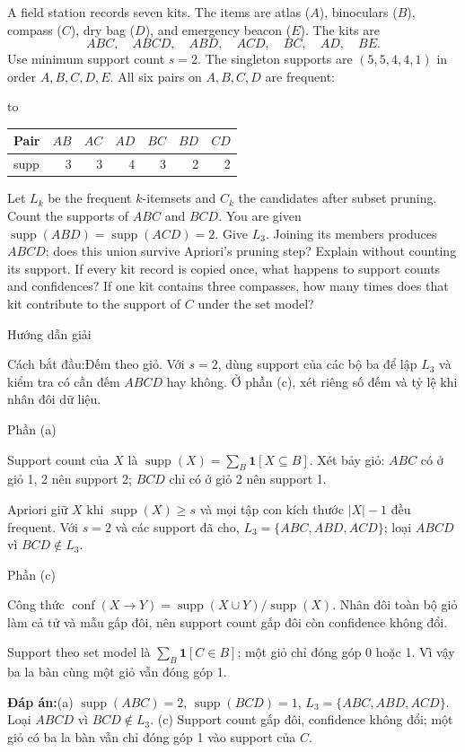 \documentclass[10pt,a4paper,twocolumn]{article}
\makeatletter
\newcommand{\maptag}[1]{\phantomsection\@bsphack\protected@write\@auxout{}{\string\newlabel{#1}{{}{\thepage}{}{\@currentHref}{}}}\@esphack}
\newcommand{\key}[1]{#1:\enspace}
\newcommand{\solutionprompt}[1]{\par\addvspace{1pt}\noindent\key{Cách bắt đầu}#1\par\addvspace{2pt}}
\newcommand{\blocklabel}[1]{\par\noindent#1\par\nobreak}
\newcommand{\answer}[1]{%
  \par\addvspace{3pt}%
  \blocklabel{#1Hướng dẫn giải}}
\newcommand{\finalanswer}[1]{%
  \par\addvspace{3pt}\noindent\textbf{Đáp án:}\nobreak\enspace#1\par}
\newcommand{\guidepart}[1]{%
  \par\addvspace{1.5pt}%
  \blocklabel{Phần #1}}
\newenvironment{examtable}[1]{%
  \par\addvspace{2pt}\noindent\hbox to \linewidth\bgroup\hfil
  \setlength{\tabcolsep}{4pt}%
  \renewcommand{\arraystretch}{1.12}\begin{tabular}{#1}%
}{\end{tabular}\hfil\egroup\par\addvspace{2pt}}
\makeatother
\begin{document}
A field station records seven kits. The items are atlas ($A$), binoculars ($B$), compass ($C$), dry bag ($D$), and emergency beacon ($E$). The kits are
\[
ABC,\quad ABCD,\quad ABD,\quad ACD,\quad BC,\quad AD,\quad BE.
\]
Use minimum support count $s=2$. The singleton supports are $(5,5,4,4,1)$ in order $A,B,C,D,E$. All six pairs on $A,B,C,D$ are frequent:
\begin{examtable}{@{}lrrrrrr@{}}
\toprule
Pair & $AB$ & $AC$ & $AD$ & $BC$ & $BD$ & $CD$\\
\midrule
supp & 3 & 3 & 4 & 3 & 2 & 2\\
\bottomrule
\end{examtable}
Let $L_k$ be the frequent $k$-itemsets and $C_k$ the candidates after subset pruning.
 Count the supports of $ABC$ and $BCD$. You are given $\operatorname{supp}(ABD)=\operatorname{supp}(ACD)=2$. Give $L_3$. Joining its members produces $ABCD$; does this union survive Apriori's pruning step? Explain without counting its support.
 If every kit record is copied once, what happens to support counts and confidences? If one kit contains three compasses, how many times does that kit contribute to the support of $C$ under the set model?

\answer{\maptag{answer:Pr1}}
\solutionprompt{Đếm theo giỏ. Với $s=2$, dùng support của các bộ ba để lập $L_3$ và kiểm tra có cần đếm $ABCD$ hay không. Ở phần (c), xét riêng số đếm và tỷ lệ khi nhân đôi dữ liệu.}
\guidepart{(a)}
\begin{guidesteps}
\item Support count của $X$ là $\operatorname{supp}(X)=\sum_B\mathbf1[X\subseteq B]$. Xét bảy giỏ: $ABC$ có ở giỏ 1, 2 nên support 2; $BCD$ chỉ có ở giỏ 2 nên support 1.
\item Apriori giữ $X$ khi $\operatorname{supp}(X)\ge s$ và mọi tập con kích thước $|X|-1$ đều frequent. Với $s=2$ và các support đã cho, $L_3=\{ABC,ABD,ACD\}$; loại $ABCD$ vì $BCD\notin L_3$.
\end{guidesteps}
\guidepart{(c)}
\begin{guidesteps}
\item Công thức $\operatorname{conf}(X\to Y)=\operatorname{supp}(X\cup Y)/\operatorname{supp}(X)$. Nhân đôi toàn bộ giỏ làm cả tử và mẫu gấp đôi, nên support count gấp đôi còn confidence không đổi.
\item Support theo set model là $\sum_B\mathbf1[C\in B]$; một giỏ chỉ đóng góp 0 hoặc 1. Vì vậy ba la bàn cùng một giỏ vẫn đóng góp 1.
\end{guidesteps}
\finalanswer{(a) $\operatorname{supp}(ABC)=2$, $\operatorname{supp}(BCD)=1$, $L_3=\{ABC,ABD,ACD\}$. Loại $ABCD$ vì $BCD\notin L_3$. (c) Support count gấp đôi, confidence không đổi; một giỏ có ba la bàn vẫn chỉ đóng góp 1 vào support của $C$.}
\end{document}
